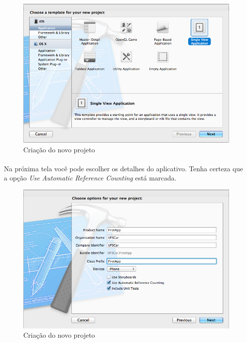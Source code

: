 \documentclass[a4paper,12pt,brazil,doubleside]{book}
\begin{document}
\begin{figure}[h]
  \centering
  \includegraphics[totalheight=0.3\textheight]{../figuras/ios/1/novo_projeto1.png}
  \caption{Criação do novo projeto}
  \label{fig:a}
\end{figure}

\bigskip

\paragraph{}Na próxima tela você pode escolher os detalhes do aplicativo. Tenha certeza que a opção \emph{Use Automatic Reference Counting} está marcada.

\begin{figure}[h]
  \centering
  \includegraphics[totalheight=0.3\textheight]{../figuras/ios/1/novo_projeto2.png}
  \caption{Criação do novo projeto}
  \label{fig:a}
\end{figure}
\end{document}
